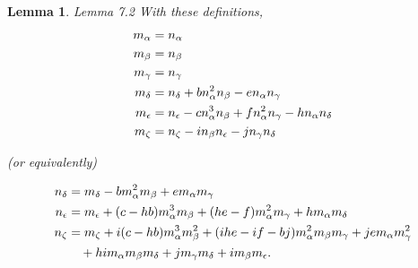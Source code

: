 \documentclass{memo-l}
\newtheorem{lemma}[theorem]{Lemma}
\theoremstyle{definition}
\theoremstyle{remark}
\numberwithin{section}{chapter}
\numberwithin{equation}{chapter}
\begin{document}
\begin{lemma}{Lemma 7.2}   With these definitions,
$$
\aligned
m_{{\alpha}} &= n_{{\alpha}} \\
m_{{\beta}} &= n_{{\beta}} \\
m_{{\gamma}} &= n_{{\gamma}}\\
m_{{\delta}} &= n_{{\delta}}+bn_{{\alpha}}^{2}n_{{\beta}}-en_{{\alpha}}
n_{{\gamma}} \\
m_{{\epsilon}} &= n_{{\epsilon}}-cn_{{\alpha}}^{3}n_{{\beta}} + 
fn_{{\alpha}}^{2}n_{{\gamma}}-hn_{{\alpha}}n_{{\delta}} \\
m_{{\zeta}} &= n_{{\zeta}}-in_{{\beta}}n_{{\epsilon}}-jn_{{\gamma}}
n_{{\delta}}
\endaligned
$$

\noindent
(or equivalently)

$$
\aligned
n_{{\delta}} &= m_{{\delta}}-bm_{{\alpha}}^{2}m_{{\beta}}+em_{{\alpha}}
m_{{\gamma}} \\
n_{{\epsilon}} &= m_{{\epsilon}}+(c-hb)m_{{\alpha}}^{3}m_{{\beta}}+(he-f)
m_{{\alpha}}^{2}m_{{\gamma}}+hm_{{\alpha}}m_{{\delta}} \\
n_{{\zeta}} &= m_{{\zeta}}+i(c-hb)m_{{\alpha}}^{3}m_{{\beta}}^{2} + 
(ihe-if-bj)m_{{\alpha}}^{2}m_{{\beta}}m_{{\gamma}}+jem_{{\alpha}}
m_{{\gamma}}^{2} \\
& \quad +him_{{\alpha}}m_{{\beta}}m_{{\delta}}+jm_{{\gamma}}
m_{{\delta}}+im_{{\beta}}m_{{\epsilon}} .
\endaligned
$$
\end{lemma}
\end{document}
